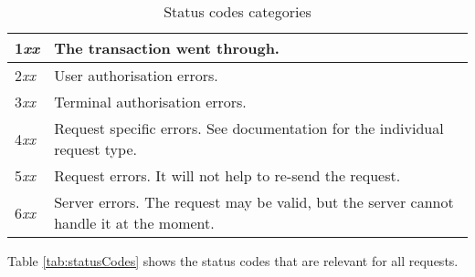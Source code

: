 \documentclass[a4paper,11pt]{article}
\newcommand{\rightcellwidth}{25em}
\begin{document}
\begin{table}[!ht]
  \begin{tabular}{|l|p{\rightcellwidth}|}
    \hline
      1\emph{xx} & The transaction went through. \\\hline
      2\emph{xx} & User authorisation errors.\\\hline
      3\emph{xx} & Terminal authorisation errors.\\\hline
      4\emph{xx} & Request specific errors. See documentation for the
                   individual request type.\\\hline
      5\emph{xx} & Request errors. It will not help to re-send the
                   request.\\\hline
      6\emph{xx} & Server errors. The request may be valid, but the
                   server cannot handle it at the moment.\\\hline 
  \end{tabular} 
  \caption{Status codes categories}
\end{table}



Table \ref{tab:statusCodes} shows the status codes that are relevant
for all requests. 
\end{document}
